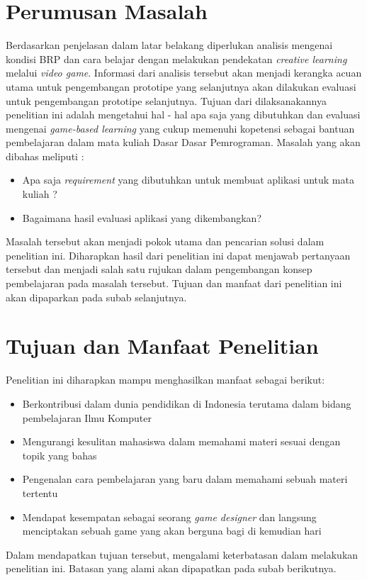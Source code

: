 \section{Perumusan Masalah}
Berdasarkan penjelasan dalam latar belakang diperlukan analisis mengenai kondisi BRP dan cara belajar dengan melakukan pendekatan \textit{creative learning} melalui \textit{video game}. Informasi dari analisis tersebut akan menjadi kerangka acuan utama untuk pengembangan prototipe \game yang selanjutnya akan dilakukan evaluasi untuk pengembangan prototipe selanjutnya.
\linebreak\linebreak
Tujuan dari dilaksanakannya penelitian ini adalah mengetahui hal - hal apa saja yang dibutuhkan dan evaluasi mengenai \textit{game-based learning} yang cukup memenuhi kopetensi sebagai bantuan pembelajaran dalam mata kuliah Dasar Dasar Pemrograman. Masalah yang akan dibahas meliputi :
\begin{itemize}
	\item Apa saja \textit{requirement} yang dibutuhkan untuk membuat aplikasi \game untuk mata kuliah \ddp?
	\item Bagaimana hasil evaluasi aplikasi \game yang dikembangkan?
\end{itemize}
Masalah tersebut akan menjadi pokok utama dan pencarian solusi dalam penelitian ini. Diharapkan hasil dari penelitian ini dapat menjawab pertanyaan tersebut dan menjadi salah satu rujukan dalam pengembangan konsep pembelajaran pada masalah tersebut. Tujuan dan manfaat dari penelitian ini akan dipaparkan pada subab selanjutnya.

\section{Tujuan dan Manfaat Penelitian}
Penelitian ini diharapkan mampu menghasilkan manfaat sebagai berikut:
\begin{itemize}
	\item Berkontribusi dalam dunia pendidikan di Indonesia terutama dalam bidang pembelajaran Ilmu Komputer
	\item Mengurangi kesulitan mahasiswa dalam memahami materi sesuai dengan topik yang \saya bahas
	\item Pengenalan cara pembelajaran yang baru dalam memahami sebuah materi tertentu
	\item Mendapat kesempatan sebagai seorang \textit{game designer} dan langsung menciptakan sebuah game yang akan berguna bagi \saya di kemudian hari
\end{itemize}
Dalam mendapatkan tujuan tersebut, \Saya mengalami keterbatasan dalam melakukan penelitian ini. Batasan yang \saya alami akan dipapatkan pada subab berikutnya.

